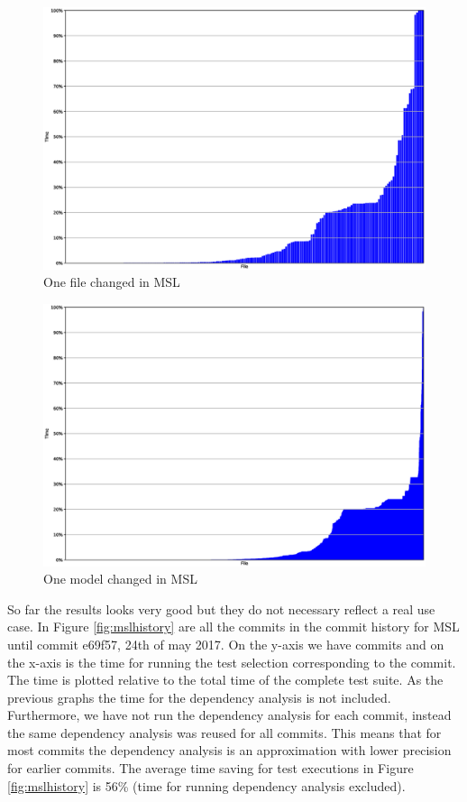 \documentclass{cslthse-msc}
\begin{document}
\begin{figure}[!htbp]
    \centering
    \includegraphics[width=\textwidth]{Graphs/MSL_one_file.eps}
    \caption{One file changed in MSL}
    \label{fig:mslonefile}
\end{figure}

\begin{figure}[!htbp]
    \centering
    \includegraphics[width=\textwidth]{Graphs/MSL_one_model.eps}
    \caption{One model changed in MSL}
    \label{fig:mslonemodel}
\end{figure}

So far the results looks very good but they do not necessary reflect a real use case. In Figure \ref{fig:mslhistory} are all the commits in the commit history for MSL until commit e69f57, 24th of may 2017. On the y-axis we have commits and on the x-axis is the time for running the test selection corresponding to the commit. The time is plotted relative to the total time of the complete test suite. As the previous graphs the time for the dependency analysis is not included. Furthermore, we have not run the dependency analysis for each commit, instead the same dependency analysis was reused for all commits. This means that for most commits the dependency analysis is an approximation with lower precision for earlier commits. The average time saving for test executions in Figure \ref{fig:mslhistory} is 56\% (time for running dependency analysis excluded).
\end{document}
